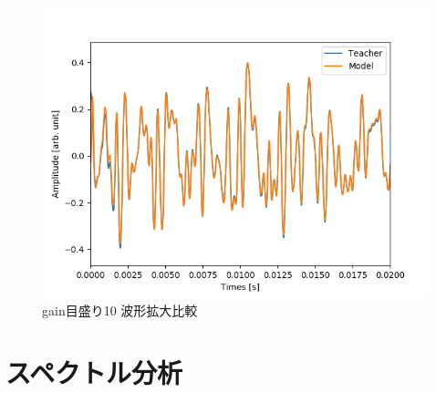 \documentclass{jreport}		%
\begin{document}
\begin{figure}[htbp]
 \begin{center}
  \includegraphics[width=150mm]{gain10_output_hikaku.png}
 \end{center}
 \caption{gain目盛り10 波形拡大比較}
 \label{fig:one}
\end{figure}

\newpage
\section{スペクトル分析}
\end{document}
